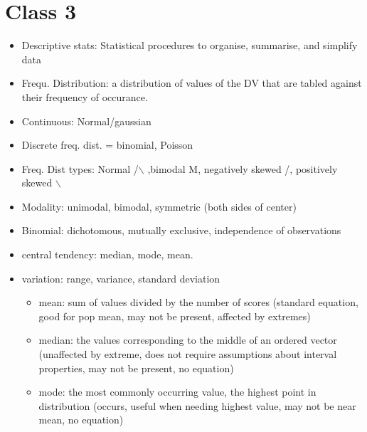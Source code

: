 \documentclass[11pt]{article}
\newenvironment{itemise}{
\begin{itemize}
  \setlength{\itemsep}{1pt}
  \setlength{\parskip}{0pt}
  \setlength{\parsep}{0pt}
}{\end{itemize}}
\begin{document}
\section*{Class 3}
\begin{itemise}
\item Descriptive stats: Statistical procedures to organise, summarise, and simplify data
\item Frequ. Distribution: a distribution of values of the DV that are tabled against their frequency of occurance.
\item Continuous: Normal/gaussian
\item Discrete freq. dist. = binomial, Poisson
\item Freq. Dist types: Normal /$\backslash$ ,bimodal M, negatively skewed /, positively skewed $\backslash$ 
\item Modality: unimodal, bimodal, symmetric (both sides of center)
\item Binomial: dichotomous, mutually exclusive, independence of observations
\item central tendency: median, mode, mean.
\item variation: range, variance, standard deviation
\begin{itemise}
\item mean: sum of values divided by the number of scores (standard equation, good for pop mean, may not be present, affected by extremes)
\item median: the values corresponding to the middle of an ordered vector (unaffected by extreme, does not require assumptions about interval properties, may not be present, no equation)
\item mode: the most commonly occurring value, the highest point in distribution (occurs, useful when needing highest value, may not be near mean, no equation)
\end{itemise}
\end{itemise}
\end{document}

